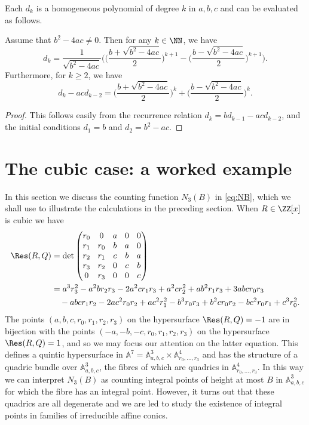 Each $d_k$ is a homogeneous polynomial of degree $k$ in $a,b,c$ and can be evaluated as follows.

\begin{lemma}\label{lem:res3}
Assume that $b^2-4ac\neq 0$.
Then for any $k\in \NN$, we have
\[
d_k=\frac{1}{\sqrt{b^2-4ac}}\biggl(\biggl(\frac{b+\sqrt{b^2-4ac}}{2}\biggr)^{k+1}-\biggl(\frac{b-\sqrt{b^2-4ac}}{2}\biggr)^{k+1}\biggr).
\]
Furthermore, for $k\geq 2$, we have
\[
d_k-acd_{k-2}=\biggl(\frac{b+\sqrt{b^2-4ac}}{2}\biggr)^{k}+\biggl(\frac{b-\sqrt{b^2-4ac}}{2}\biggr)^{k}.
\]
\end{lemma}
\begin{proof}
This follows easily from the recurrence relation $d_k=bd_{k-1}-acd_{k-2}$, and the initial conditions $d_{1}=b$ and $d_2=b^2-ac$.
\end{proof}

\section{The cubic case: a worked example}\label{s:3}

In this section we
discuss the counting function $N_3(B)$ in \eqref{eq:NB},
which we shall use to
illustrate the calculations in the preceding section.
When $R\in \ZZ[x]$ is cubic we have
\begin{align*}
\Res(R,Q)
&\arraycolsep4.5pt=
\det
\begin{pmatrix}
r_0 & 0 & a& 0& 0 \\
r_1 & r_0& b& a& 0 \\
r_2 & r_1& c& b& a \\
r_3 & r_2& 0& c& b \\
0 & r_3& 0& 0& c \\
\end{pmatrix}\\
&=a^3 r_3^2
-a^2 b r_2 r_3-2 a^2 c r_1 r_3 + a^2 c r_2^2+
a b^2 r_1 r_3 + 3 a b c r_0 r_3 \\
&\quad - a b c r_1 r_2 - 2 a c^2 r_0 r_2 +
a c^2 r_1^2
-b^3 r_0 r_3 + b^2 c r_0 r_2-b c^2 r_0 r_1 + c^3 r_0^2.
\end{align*}
The points $(a,b,c,r_0,r_1,r_2,r_3)$ on the hypersurface
$\Res(R,Q)=-1$ are in bijection with the
points $(-a,-b,-c,r_0,r_1,r_2,r_3)$ on the hypersurface
$\Res(R,Q)=1$, and so we may focus our attention on the latter equation.
This
defines a quintic hypersurface in $\mathbb{A}^7=\mathbb{A}_{a,b,c}^3\times \mathbb{A}_{r_0,\dots,r_3}^4$ and has the structure of a quadric bundle over $\mathbb{A}_{a,b,c}^3$, the fibres of which are quadrics in $\mathbb{A}_{r_0,\dots,r_3}^4$. In this way we can interpret $N_3(B)$ as counting integral points of height at most $B$ in $\mathbb{A}_{a,b,c}^3$ for which the fibre has
an integral point. However, it turns out that these quadrics are all degenerate and we are led to study
the existence of integral points in families of
irreducible affine conics.

